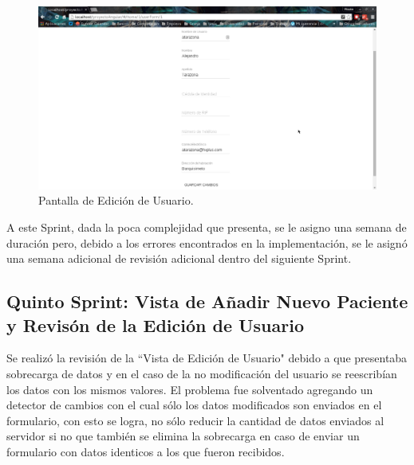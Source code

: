     \begin{figure}[htbp!]
        \begin{center}
            \includegraphics[width=.9\textwidth]{figures/p5}
        \end{center}
        \caption{Pantalla de Edición de Usuario.}
        \label{Edición}
    \end{figure}
    
    A este Sprint, dada la poca complejidad que presenta, se le asigno una semana de duración pero, debido a los errores encontrados en la implementación, se le asignó una semana adicional de revisión adicional dentro del siguiente Sprint.
    
    \subsection{Quinto Sprint: Vista de Añadir Nuevo Paciente y Revisón de la Edición de Usuario}
    
    Se realizó la revisión de la ``Vista de Edición de Usuario" debido a que presentaba sobrecarga de datos y en el caso de la no modificación del usuario se reescribían los datos con los mismos valores. El problema fue solventado agregando un detector de cambios con el cual sólo los datos modificados son enviados en el formulario, con esto se logra, no sólo reducir la cantidad de datos enviados al servidor si no que también se elimina la sobrecarga en caso de enviar un formulario con datos identicos a los que fueron recibidos.
    
